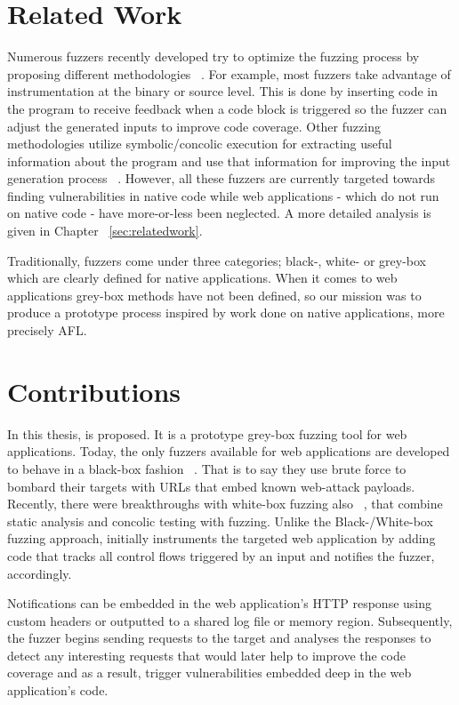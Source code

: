 \section{Related Work}
Numerous fuzzers recently developed try to optimize the fuzzing process by proposing different methodologies ~\cite{godefroid2012sage, stephens2016driller, rawat2017vuzzer, aschermann2019nautilus, aschermann2019redqueen, hoffman2020Was, osterlund2020parmesan}. 
For example, most fuzzers take advantage of instrumentation at the binary or source level. This is done by inserting code in the program to receive feedback when a code block is
triggered so the fuzzer can adjust the generated inputs to improve code coverage. 
Other fuzzing methodologies utilize symbolic/concolic execution for extracting useful information about the program and use that information for improving the input generation process ~\cite{stephens2016driller,godefroid2005dart,godefroid2012sage}. However, all these fuzzers are currently targeted towards finding vulnerabilities in native code while web applications - which do not run on native code - have more-or-less been neglected. A more detailed analysis is given in Chapter ~\ref{sec:relatedwork}.

Traditionally, fuzzers come under three categories; black-, white- or grey-box which are clearly defined for native applications. When it comes to web applications grey-box methods have not been defined, so our mission was to produce a prototype process inspired by work done on native applications, more precisely AFL.

\section{Contributions}
In this thesis, \pname{} is proposed. It is a prototype grey-box fuzzing tool for web applications. Today, the only fuzzers available for web applications are developed to behave in a black-box fashion ~\cite{doupe2010johnny}. That is to say they use brute force to bombard their targets with URLs that embed known web-attack payloads. Recently, there were breakthroughs with white-box fuzzing also ~\cite{navex2018,Borges2018BaZINGAWF}, that combine static analysis and concolic testing with fuzzing. Unlike the Black-/White-box fuzzing approach, \pname{} initially instruments the targeted web application by adding code that tracks all control flows triggered by an input and notifies the fuzzer, accordingly. 

Notifications can be embedded in the web application's HTTP response using custom headers or outputted to a shared log file or memory region. 
Subsequently, the fuzzer begins sending requests to the target and analyses the responses to detect any interesting requests that would later help to improve the code coverage and as a result, trigger vulnerabilities embedded deep in the web application's code.

